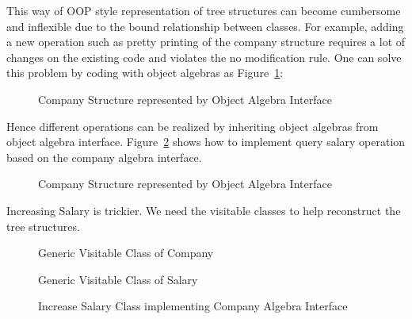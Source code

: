 This way of OOP style representation of tree structures can become cumbersome and inflexible due to the bound relationship between classes. For example, adding a new operation such as pretty printing of the company structure requires a lot of changes on the existing code and violates the no modification rule. One can solve this problem by coding with object algebras as Figure~\ref{syb_tree}: 
\begin{figure}[tb]
\vspace{-.1in}
\caption{Company Structure represented by Object Algebra Interface}
\label{syb_tree}
\end{figure}

Hence different operations can be realized by inheriting object algebras from object algebra interface. Figure~\ref{query_salary} shows how to implement query salary operation based on the company algebra interface.  
\begin{figure}[tb]
\vspace{-.1in}
\caption{Company Structure represented by Object Algebra Interface}
\label{query_salary}
\end{figure}

Increasing Salary is trickier. We need the visitable classes to help reconstruct  the tree structures. 
\begin{figure}[tb]
\vspace{-.1in}
\caption{Generic Visitable Class of Company}
\label{g_company}
\end{figure}
\begin{figure}[tb]
\vspace{-.1in}
\caption{Generic Visitable Class of Salary}
\label{g_salary}
\end{figure}
\begin{figure}[tb]
\vspace{-.1in}
\caption{Increase Salary Class implementing Company Algebra Interface}
\label{increase_salary}
\end{figure}

